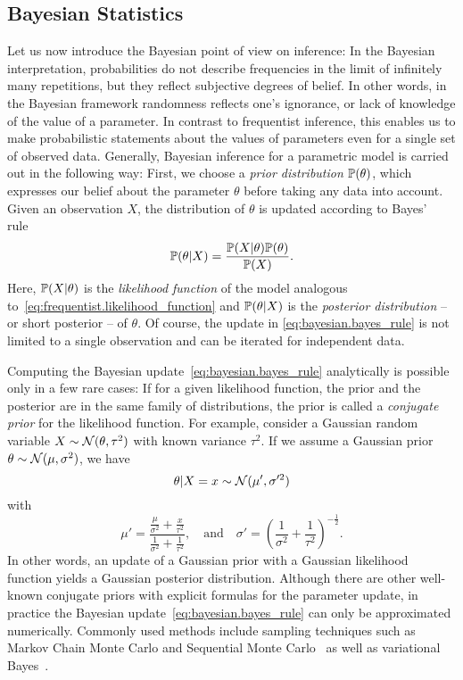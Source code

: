 \subsection{Bayesian Statistics}
\label{sub:intro.bayesian}


Let us now introduce the Bayesian point of view on inference:
In the Bayesian interpretation, probabilities do not describe frequencies in the limit of infinitely many repetitions, but they reflect subjective degrees of belief.
In other words, in the Bayesian framework randomness reflects one's ignorance, or lack of knowledge of the value of a parameter.
In contrast to frequentist inference, this enables us to make probabilistic statements about the values of parameters even for a single set of observed data.
Generally, Bayesian inference for a parametric model is carried out in the following way:
First, we choose a \emph{prior distribution} $\mathbb{P}(\theta)$, which expresses our belief about the parameter $\theta$ before taking any data into account.
Given an observation $X$, the distribution of $\theta$ is updated according to Bayes' rule~\cite{}
\[
  \label{eq:bayesian.bayes_rule}
  \mathbb{P}(\theta | X) = \frac{\mathbb{P}(X | \theta) \mathbb{P}(\theta)}{\mathbb{P}(X)}.
\]
Here, $\mathbb{P}(X|\theta)$ is the \emph{likelihood function} of the model analogous to~\eqref{eq:frequentist.likelihood_function} and $\mathbb{P}(\theta | X)$ is the \emph{posterior distribution} -- or short posterior -- of $\theta$.
Of course, the update in \cref{eq:bayesian.bayes_rule} is not limited to a single observation and can be iterated for independent data.

Computing the Bayesian update~\eqref{eq:bayesian.bayes_rule} analytically is possible only in a few rare cases:
If for a given likelihood function, the prior and the posterior are in the same family of distributions, the prior is called a \emph{conjugate prior} for the likelihood function.
For example, consider a Gaussian random variable $X \sim \mathcal{N}(\theta, \tau^2)$ with known variance $\tau^2$.
If we assume a Gaussian prior $\theta \sim \mathcal{N}(\mu, \sigma^2)$, we have~\cite{}
\[
  \theta \vert X=x \sim \mathcal{N} (\mu', \sigma'^2)
\]
with
\[
  \label{eq:bayesian.kalman}
  \mu' = \frac{ \frac{\mu}{\sigma^2} + \frac{x}{\tau^2} }{ \frac{1}{\sigma^2} + \frac{1}{\tau^2} },
  \quad\mbox{and}\quad
  \sigma' = \left( \frac{1}{\sigma^2} + \frac{1}{\tau^2} \right)^{- \tfrac{1}{2}}.
\]
In other words, an update of a Gaussian prior with a Gaussian likelihood function yields a Gaussian posterior distribution.
Although there are other well-known conjugate priors with explicit formulas for the parameter update, in practice the Bayesian update~\eqref{eq:bayesian.bayes_rule} can only be approximated numerically.
Commonly used methods include sampling techniques such as Markov Chain Monte Carlo and Sequential Monte Carlo~\cite{} as well as variational Bayes~\cite{}.\\


